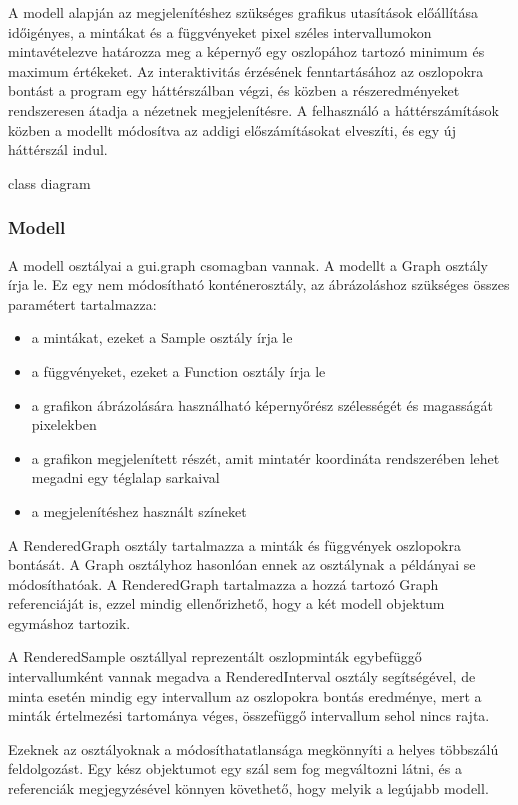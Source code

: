 A modell alapján az megjelenítéshez szükséges grafikus utasítások előállítása időigényes, a mintákat és a függvényeket pixel széles intervallumokon mintavételezve határozza meg a képernyő egy oszlopához tartozó minimum és maximum értékeket. Az interaktivitás érzésének fenntartásához az oszlopokra bontást a program egy háttérszálban végzi, és közben a részeredményeket rendszeresen átadja a nézetnek megjelenítésre. A felhasználó a háttérszámítások közben a modellt módosítva az addigi előszámításokat elveszíti, és egy új háttérszál indul.

{\color{red} class diagram}

\subsubsection{Modell}

A modell osztályai a gui.graph csomagban vannak.
A modellt a Graph osztály írja le. Ez egy nem módosítható konténerosztály, az ábrázoláshoz szükséges összes paramétert tartalmazza:
\begin{itemize}
\item a mintákat, ezeket a Sample osztály írja le
\item a függvényeket, ezeket a Function osztály írja le
\item a grafikon ábrázolására használható képernyőrész szélességét és magasságát pixelekben
\item a grafikon megjelenített részét, amit mintatér koordináta rendszerében lehet megadni egy téglalap sarkaival
\item a megjelenítéshez használt színeket
\end{itemize}

A RenderedGraph osztály tartalmazza a minták és függvények oszlopokra bontását. A Graph osztályhoz hasonlóan ennek az osztálynak a példányai se módosíthatóak. A RenderedGraph tartalmazza a hozzá tartozó Graph referenciáját is, ezzel mindig ellenőrizhető, hogy a két modell objektum egymáshoz tartozik.

A RenderedSample osztállyal reprezentált oszlopminták egybefüggő intervallumként vannak megadva a RenderedInterval osztály segítségével, de minta esetén mindig egy intervallum az oszlopokra bontás eredménye, mert a minták értelmezési tartománya véges, összefüggő intervallum sehol nincs rajta.

Ezeknek az osztályoknak a módosíthatatlansága megkönnyíti a helyes többszálú feldolgozást. Egy kész objektumot egy szál sem fog megváltozni látni, és a referenciák megjegyzésével könnyen követhető, hogy melyik a legújabb modell.

